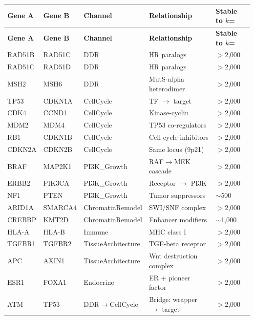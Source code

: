 \documentclass[11pt]{article}
\theoremstyle{definition}
\begin{document}
\begin{longtable}{p{1.5cm} p{1.5cm} p{3cm} p{4cm} p{2.5cm}}
\toprule
\textbf{Gene A} & \textbf{Gene B} & \textbf{Channel} & \textbf{Relationship} & \textbf{Stable to $k$=} \\
\midrule
\endfirsthead
\toprule
\textbf{Gene A} & \textbf{Gene B} & \textbf{Channel} & \textbf{Relationship} & \textbf{Stable to $k$=} \\
\midrule
\endhead
RAD51B & RAD51C & DDR & HR paralogs & $>$2,000 \\
RAD51C & RAD51D & DDR & HR paralogs & $>$2,000 \\
MSH2 & MSH6 & DDR & MutS-alpha heterodimer & $>$2,000 \\
TP53 & CDKN1A & CellCycle & TF $\to$ target & $>$2,000 \\
CDK4 & CCND1 & CellCycle & Kinase-cyclin & $>$2,000 \\
MDM2 & MDM4 & CellCycle & TP53 co-regulators & $>$2,000 \\
RB1 & CDKN1B & CellCycle & Cell cycle inhibitors & $>$2,000 \\
CDKN2A & CDKN2B & CellCycle & Same locus (9p21) & $>$2,000 \\
BRAF & MAP2K1 & PI3K\_Growth & RAF$\to$MEK cascade & $>$2,000 \\
ERBB2 & PIK3CA & PI3K\_Growth & Receptor $\to$ PI3K & $>$2,000 \\
NF1 & PTEN & PI3K\_Growth & Tumor suppressors & $\sim$500 \\
ARID1A & SMARCA4 & ChromatinRemodel & SWI/SNF complex & $>$2,000 \\
CREBBP & KMT2D & ChromatinRemodel & Enhancer modifiers & $\sim$1,000 \\
HLA-A & HLA-B & Immune & MHC class I & $>$2,000 \\
TGFBR1 & TGFBR2 & TissueArchitecture & TGF-beta receptor & $>$2,000 \\
APC & AXIN1 & TissueArchitecture & Wnt destruction complex & $>$2,000 \\
ESR1 & FOXA1 & Endocrine & ER + pioneer factor & $>$2,000 \\
ATM & TP53 & DDR$\to$CellCycle & Bridge: wrapper $\to$ target & $>$2,000 \\
\bottomrule
\end{longtable}
\end{document}
